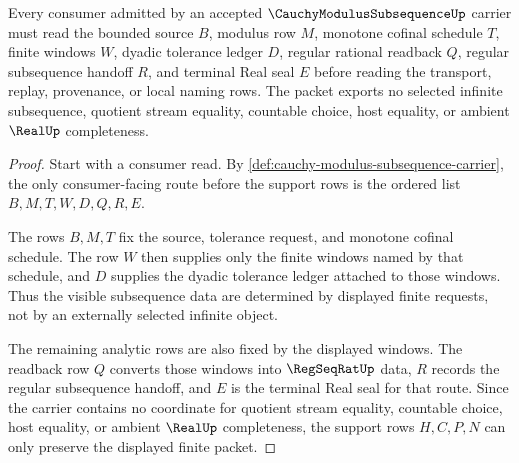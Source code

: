 \begin{theorem}
\label{thm:cauchy-modulus-subsequence-window-determinacy}
Every consumer admitted by an accepted $\CauchyModulusSubsequenceUp$ carrier must read the bounded source $B$, modulus row $M$, monotone cofinal schedule $T$, finite windows $W$, dyadic tolerance ledger $D$, regular rational readback $Q$, regular subsequence handoff $R$, and terminal Real seal $E$ before reading the transport, replay, provenance, or local naming rows. The packet exports no selected infinite subsequence, quotient stream equality, countable choice, host equality, or ambient $\RealUp$ completeness.
\end{theorem}
\begin{proof}
Start with a consumer read. By \autoref{def:cauchy-modulus-subsequence-carrier}, the only consumer-facing route before the support rows is the ordered list $B,M,T,W,D,Q,R,E$.

The rows $B,M,T$ fix the source, tolerance request, and monotone cofinal schedule. The row $W$ then supplies only the finite windows named by that schedule, and $D$ supplies the dyadic tolerance ledger attached to those windows. Thus the visible subsequence data are determined by displayed finite requests, not by an externally selected infinite object.

The remaining analytic rows are also fixed by the displayed windows. The readback row $Q$ converts those windows into $\RegSeqRatUp$ data, $R$ records the regular subsequence handoff, and $E$ is the terminal Real seal for that route. Since the carrier contains no coordinate for quotient stream equality, countable choice, host equality, or ambient $\RealUp$ completeness, the support rows $H,C,P,N$ can only preserve the displayed finite packet.
\end{proof}


